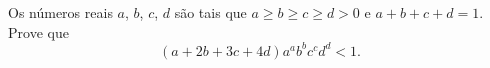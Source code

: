 Os números reais $a$, $b$, $c$, $d$ são tais que $a \geq b \geq c \geq d > 0$ e $a + b + c + d = 1$. Prove que \[ (a + 2b + 3c + 4d) a^a b^b c^c d^d < 1.\]
